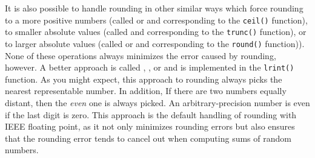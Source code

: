 It is also possible to handle rounding in other similar ways which force rounding to a more positive numbers (called  or  and corresponding to the \lstinline|ceil()| function), to smaller absolute values (called  and corresponding to the \lstinline|trunc()| function), or to larger absolute values (called  or  and corresponding to the \lstinline|round()| function)).  None of these operations always minimizes the error caused by rounding, however.  A better approach is called , , or  and is implemented in the \lstinline|lrint()| function. As you might expect, this approach to rounding always picks the nearest representable number.  In addition, If there are two numbers equally distant, then the \emph{even} one is always picked.  An arbitrary-precision number is even if the last digit is zero.  This approach is the default handling of rounding with IEEE floating point, as it not only minimizes rounding errors but also ensures that the rounding error tends to cancel out when computing sums of random numbers.
\tabspace\\
\tabspace\\


